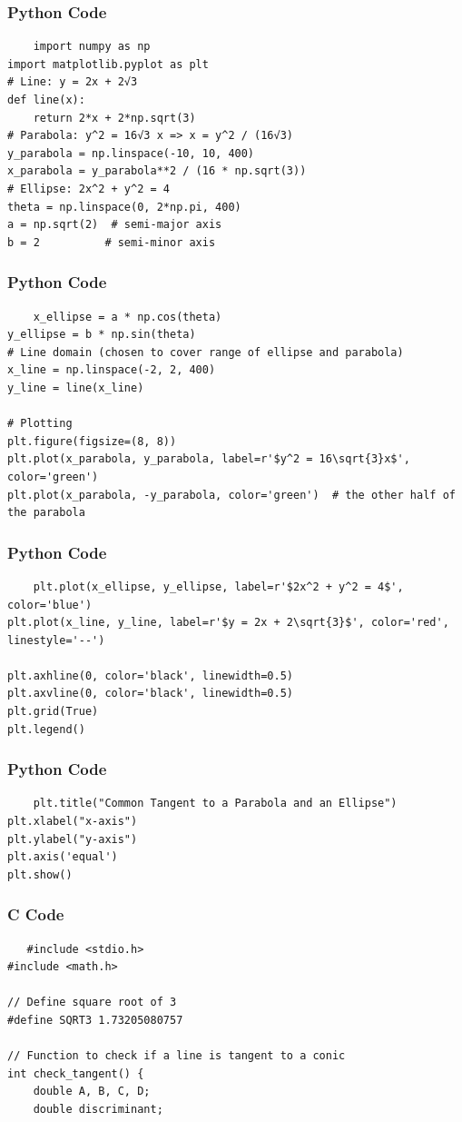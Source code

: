 \documentclass{beamer}
\begin{document}
\begin{frame}[fragile]
\frametitle{Python Code}
\begin{lstlisting}
    import numpy as np
import matplotlib.pyplot as plt
# Line: y = 2x + 2√3
def line(x):
    return 2*x + 2*np.sqrt(3)
# Parabola: y^2 = 16√3 x => x = y^2 / (16√3)
y_parabola = np.linspace(-10, 10, 400)
x_parabola = y_parabola**2 / (16 * np.sqrt(3))
# Ellipse: 2x^2 + y^2 = 4
theta = np.linspace(0, 2*np.pi, 400)
a = np.sqrt(2)  # semi-major axis
b = 2          # semi-minor axis
\end{lstlisting}
\end{frame}
\begin{frame}[fragile]
\frametitle{Python Code}
\begin{lstlisting}
    x_ellipse = a * np.cos(theta)
y_ellipse = b * np.sin(theta)
# Line domain (chosen to cover range of ellipse and parabola)
x_line = np.linspace(-2, 2, 400)
y_line = line(x_line)

# Plotting
plt.figure(figsize=(8, 8))
plt.plot(x_parabola, y_parabola, label=r'$y^2 = 16\sqrt{3}x$', color='green')
plt.plot(x_parabola, -y_parabola, color='green')  # the other half of the parabola
\end{lstlisting}
\end{frame}
\begin{frame}[fragile]
\frametitle{Python Code}
\begin{lstlisting}
    plt.plot(x_ellipse, y_ellipse, label=r'$2x^2 + y^2 = 4$', color='blue')
plt.plot(x_line, y_line, label=r'$y = 2x + 2\sqrt{3}$', color='red', linestyle='--')

plt.axhline(0, color='black', linewidth=0.5)
plt.axvline(0, color='black', linewidth=0.5)
plt.grid(True)
plt.legend()
\end{lstlisting}
\end{frame}
\begin{frame}[fragile]
\frametitle{Python Code}
\begin{lstlisting}
    plt.title("Common Tangent to a Parabola and an Ellipse")
plt.xlabel("x-axis")
plt.ylabel("y-axis")
plt.axis('equal')
plt.show()
\end{lstlisting}
\end{frame}
\begin{frame}[fragile]
\frametitle{C Code}
\begin{lstlisting}
   #include <stdio.h>
#include <math.h>

// Define square root of 3
#define SQRT3 1.73205080757

// Function to check if a line is tangent to a conic
int check_tangent() {
    double A, B, C, D;
    double discriminant; 
\end{lstlisting}
\end{frame}
\end{document}

